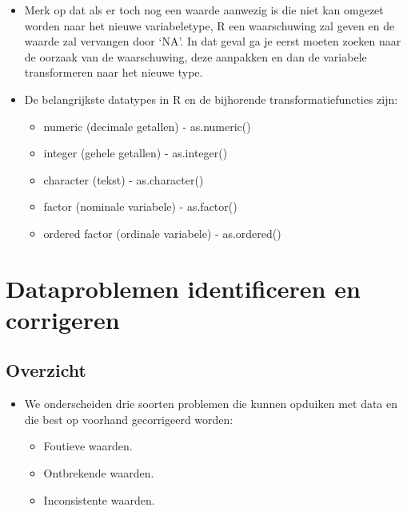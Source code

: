 \documentclass[]{tufte-book}
\providecommand{\tightlist}{%
  \setlength{\itemsep}{0pt}\setlength{\parskip}{0pt}}
\begin{document}
\begin{itemize}
\tightlist
\item
  Merk op dat als er toch nog een waarde aanwezig is die niet kan omgezet worden naar het nieuwe variabeletype, R een waarschuwing zal geven en de waarde zal vervangen door `NA'. In dat geval ga je eerst moeten zoeken naar de oorzaak van de waarschuwing, deze aanpakken en dan de variabele transformeren naar het nieuwe type.
\item
  De belangrijkste datatypes in R en de bijhorende transformatiefuncties zijn:

  \begin{itemize}
  \tightlist
  \item
    numeric (decimale getallen) - as.numeric()
  \item
    integer (gehele getallen) - as.integer()
  \item
    character (tekst) - as.character()
  \item
    factor (nominale variabele) - as.factor()
  \item
    ordered factor (ordinale variabele) - as.ordered()
  \end{itemize}
\end{itemize}

\hypertarget{dataproblemen-identificeren-en-corrigeren}{%
\section{Dataproblemen identificeren en corrigeren}\label{dataproblemen-identificeren-en-corrigeren}}

\hypertarget{overzicht}{%
\subsection{Overzicht}\label{overzicht}}

\begin{itemize}
\tightlist
\item
  We onderscheiden drie soorten problemen die kunnen opduiken met data en die best op voorhand gecorrigeerd worden:

  \begin{itemize}
  \tightlist
  \item
    Foutieve waarden.
  \item
    Ontbrekende waarden.
  \item
    Inconsistente waarden.
  \end{itemize}
\end{itemize}
\end{document}
